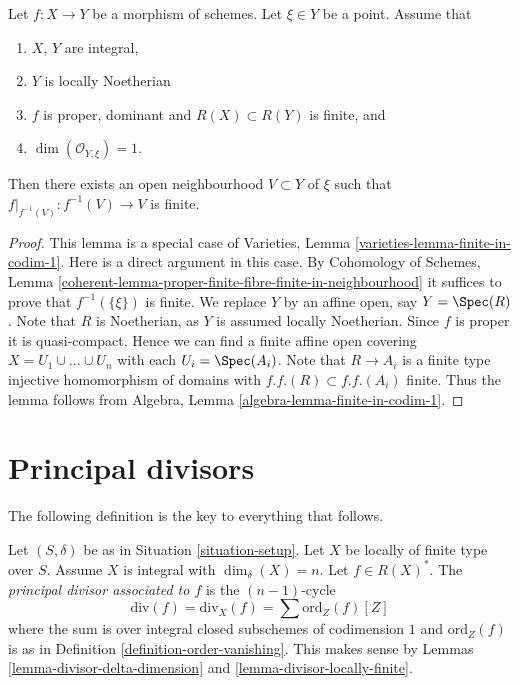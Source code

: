 \begin{lemma}
\label{lemma-finite-in-codimension-one}
Let $f : X \to Y$ be a morphism of schemes.
Let $\xi \in Y$ be a point.
Assume that
\begin{enumerate}
\item $X$, $Y$ are integral,
\item $Y$ is locally Noetherian
\item $f$ is proper, dominant and $R(X) \subset R(Y)$ is finite, and
\item $\dim(\mathcal{O}_{Y, \xi}) = 1$.
\end{enumerate}
Then there exists an open neighbourhood $V \subset Y$ of $\xi$
such that $f|_{f^{-1}(V)} : f^{-1}(V) \to V$ is finite.
\end{lemma}

\begin{proof}
This lemma is a special case of
Varieties, Lemma \ref{varieties-lemma-finite-in-codim-1}.
Here is a direct argument in this case.
By Cohomology of Schemes,
Lemma \ref{coherent-lemma-proper-finite-fibre-finite-in-neighbourhood}
it suffices to prove that $f^{-1}(\{\xi\})$ is finite.
We replace $Y$ by an affine open, say $Y = \Spec(R)$.
Note that $R$ is Noetherian, as $Y$ is assumed locally Noetherian.
Since $f$ is proper it is quasi-compact. Hence we can find a finite
affine open covering $X = U_1 \cup \ldots \cup U_n$ with
each $U_i = \Spec(A_i)$. Note that $R \to A_i$ is a
finite type injective homomorphism of domains with
$f.f.(R) \subset f.f.(A_i)$ finite. Thus the lemma follows
from Algebra, Lemma \ref{algebra-lemma-finite-in-codim-1}.
\end{proof}


\section{Principal divisors}
\label{section-principal-divisors}

\noindent
The following definition is the key to everything that follows.

\begin{definition}
\label{definition-principal-divisor}
Let $(S, \delta)$ be as in Situation \ref{situation-setup}.
Let $X$ be locally of finite type over $S$. Assume $X$ is
integral with $\dim_\delta(X) = n$.
Let $f \in R(X)^*$. The {\it principal divisor
associated to $f$} is the $(n - 1)$-cycle
$$
\text{div}(f) = \text{div}_X(f) = \sum \text{ord}_Z(f) [Z]
$$
where the sum is over integral closed subschemes of
codimension $1$ and $\text{ord}_Z(f)$ is as in
Definition \ref{definition-order-vanishing}. This makes sense
by Lemmas \ref{lemma-divisor-delta-dimension} and
\ref{lemma-divisor-locally-finite}.
\end{definition}


